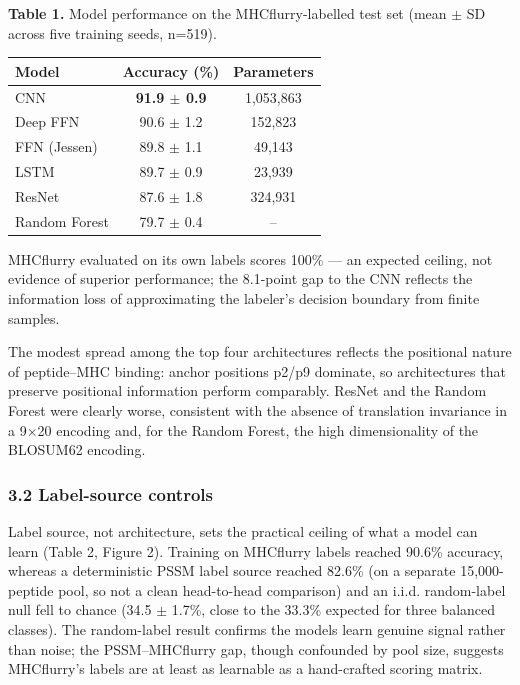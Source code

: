 \documentclass[10pt]{article}
\newcounter{none} %
\begin{document}
\textbf{Table 1.} Model performance on the MHCflurry-labelled test set
(mean $\pm$ SD across five training seeds, n=519).

{\def\LTcaptype{none} %
\begin{longtable}[]{@{}lcc@{}}
\toprule\noalign{}
Model & Accuracy (\%) & Parameters \\
\midrule\noalign{}
\endhead
\bottomrule\noalign{}
\endlastfoot
CNN & \textbf{91.9 $\pm$ 0.9} & 1,053,863 \\
Deep FFN & 90.6 $\pm$ 1.2 & 152,823 \\
FFN (Jessen) & 89.8 $\pm$ 1.1 & 49,143 \\
LSTM & 89.7 $\pm$ 0.9 & 23,939 \\
ResNet & 87.6 $\pm$ 1.8 & 324,931 \\
Random Forest & 79.7 $\pm$ 0.4 & -- \\
\end{longtable}
}

\textdagger MHCflurry evaluated on its own labels scores 100\% --- an expected
ceiling, not evidence of superior performance; the 8.1-point gap to the
CNN reflects the information loss of approximating the labeler's
decision boundary from finite samples.

The modest spread among the top four architectures reflects the
positional nature of peptide--MHC binding: anchor positions p2/p9
dominate, so architectures that preserve positional information perform
comparably. ResNet and the Random Forest were clearly worse, consistent
with the absence of translation invariance in a 9$\times$20 encoding and, for
the Random Forest, the high dimensionality of the BLOSUM62 encoding.

\subsubsection{3.2 Label-source controls}\label{label-source-controls}

Label source, not architecture, sets the practical ceiling of what a
model can learn (Table 2, Figure 2). Training on MHCflurry labels
reached 90.6\% accuracy, whereas a deterministic PSSM label source
reached 82.6\% (on a separate 15,000-peptide pool, so not a clean
head-to-head comparison) and an i.i.d. random-label null fell to chance
(34.5 $\pm$ 1.7\%, close to the 33.3\% expected for three balanced classes).
The random-label result confirms the models learn genuine signal rather
than noise; the PSSM--MHCflurry gap, though confounded by pool size,
suggests MHCflurry's labels are at least as learnable as a hand-crafted
scoring matrix.
\end{document}
